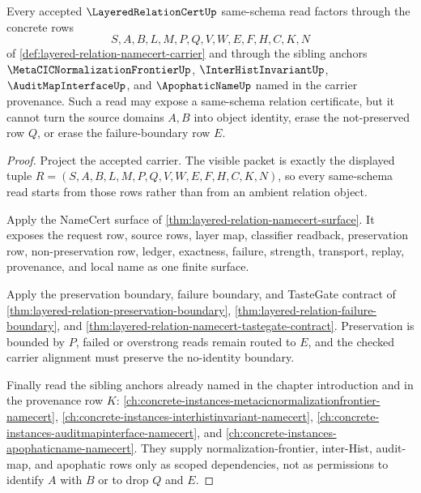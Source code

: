 \begin{theorem}
\label{thm:layeredrelationcert-scope-closure}
Every accepted $\LayeredRelationCertUp$ same-schema read factors through the concrete rows
$$
S,A,B,L,M,P,Q,V,W,E,F,H,C,K,N
$$
of \autoref{def:layered-relation-namecert-carrier} and through the sibling anchors $\MetaCICNormalizationFrontierUp$, $\InterHistInvariantUp$, $\AuditMapInterfaceUp$, and $\ApophaticNameUp$ named in the carrier provenance. Such a read may expose a same-schema relation certificate, but it cannot turn the source domains $A,B$ into object identity, erase the not-preserved row $Q$, or erase the failure-boundary row $E$.
\end{theorem}
\begin{proof}
Project the accepted carrier. The visible packet is exactly the displayed tuple $R=(S,A,B,L,M,P,Q,V,W,E,F,H,C,K,N)$, so every same-schema read starts from those rows rather than from an ambient relation object.

Apply the NameCert surface of \autoref{thm:layered-relation-namecert-surface}. It exposes the request row, source rows, layer map, classifier readback, preservation row, non-preservation row, ledger, exactness, failure, strength, transport, replay, provenance, and local name as one finite surface.

Apply the preservation boundary, failure boundary, and TasteGate contract of \autoref{thm:layered-relation-preservation-boundary}, \autoref{thm:layered-relation-failure-boundary}, and \autoref{thm:layered-relation-namecert-tastegate-contract}. Preservation is bounded by $P$, failed or overstrong reads remain routed to $E$, and the checked carrier alignment must preserve the no-identity boundary.

Finally read the sibling anchors already named in the chapter introduction and in the provenance row $K$: \autoref{ch:concrete-instances-metacicnormalizationfrontier-namecert}, \autoref{ch:concrete-instances-interhistinvariant-namecert}, \autoref{ch:concrete-instances-auditmapinterface-namecert}, and \autoref{ch:concrete-instances-apophaticname-namecert}. They supply normalization-frontier, inter-Hist, audit-map, and apophatic rows only as scoped dependencies, not as permissions to identify $A$ with $B$ or to drop $Q$ and $E$.
\end{proof}

